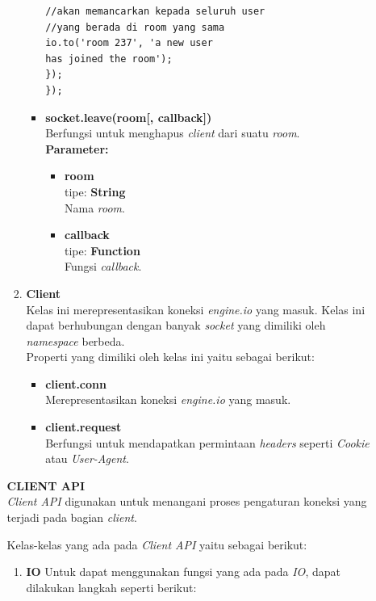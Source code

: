 \documentclass[a4paper,twoside]{article}
\begin{document}
\begin{enumerate}
\begin{enumerate}
\begin{enumerate}
\begin{itemize}
\begin{lstlisting}
//akan memancarkan kepada seluruh user 
//yang berada di room yang sama
io.to('room 237', 'a new user 
has joined the room'); 
});
});
\end{lstlisting}
					
					\item \textbf{socket.leave(room[, callback])} \\
					Berfungsi untuk menghapus \textit{client} dari suatu \textit{room}. \\
					\textbf{Parameter:}
					\begin{itemize}
						\item \textbf{room} \\tipe: \textbf{String} \\ Nama \textit{room}.
						\item \textbf{callback} \\tipe: \textbf{Function} \\ Fungsi \textit{callback}.
					\end{itemize}
					
				\end{itemize}
				
				\item \textbf{Client} \\
				Kelas ini merepresentasikan koneksi \textit{engine.io} yang masuk. Kelas ini dapat berhubungan dengan banyak \textit{socket} yang dimiliki oleh \textit{namespace} berbeda. \\
				Properti yang dimiliki oleh kelas ini yaitu sebagai berikut:
				\begin{itemize}
					\item \textbf{client.conn} \\ Merepresentasikan koneksi \textit{engine.io} yang masuk.
					\item \textbf{client.request} \\ Berfungsi untuk mendapatkan permintaan \textit{headers} seperti \textit{Cookie} atau \textit{User-Agent}.
				\end{itemize}
				
			\end{enumerate}
		
		\textbf{CLIENT API} \\
		\textit{Client API} digunakan untuk menangani proses pengaturan koneksi yang terjadi pada bagian \textit{client}. 
		
		Kelas-kelas yang ada pada \textit{Client API} yaitu sebagai berikut:
		\begin{enumerate}
			\item \textbf{IO}
			Untuk dapat menggunakan fungsi yang ada pada \textit{IO}, dapat dilakukan langkah seperti berikut:
\begin{lstlisting}
			

\end{lstlisting}
\end{enumerate}
\end{enumerate}
\end{enumerate}
\end{document}
